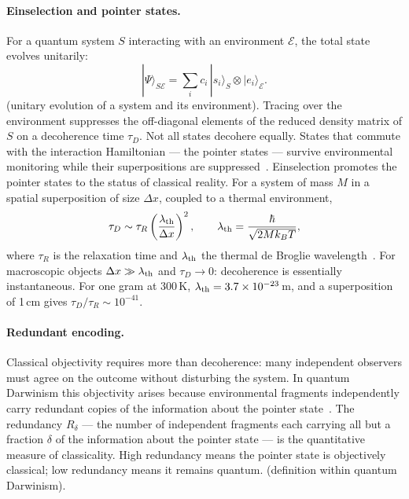 \paragraph{Einselection and pointer states.} For a quantum system $S$ interacting with an environment $\mathcal E$, the total state evolves unitarily:
\begin{equation}
|\Psi\rangle_{S\mathcal E}=\sum_i c_i\,|s_i\rangle_S\otimes|e_i\rangle_{\mathcal E}.\label{eq:qr_SE}
\end{equation}
\derived{} (unitary evolution of a system and its environment). Tracing over the environment suppresses the off-diagonal elements of the reduced density
matrix of $S$ on a decoherence time $\tau_D$. Not all states decohere equally. States that commute with the interaction Hamiltonian --- the pointer
states --- survive environmental monitoring while their superpositions are suppressed~\cite{Zurek1981}. Einselection promotes the pointer states to the
status of classical reality. For a system of mass $M$ in a spatial superposition of size $\Delta x$, coupled to a thermal environment,
\begin{equation}
\tau_D\sim\tau_R\left(\frac{\lambda_{\rm th}}{\Delta x}\right)^2,\qquad\lambda_{\rm th}=\frac{\hbar}{\sqrt{2Mk_BT}},\label{eq:qr_tauD}
\end{equation}
where $\tau_R$ is the relaxation time and $\lambda_{\rm th}$ the thermal de Broglie wavelength~\cite{Zurek2003,JoosZeh1985}. \derived{} For macroscopic
objects $\Delta x\gg\lambda_{\rm th}$ and $\tau_D\to0$: decoherence is essentially instantaneous. For one gram at 300\,K, $\lambda_{\rm th}=3.7\times
10^{-23}$\,m, and a superposition of 1\,cm gives $\tau_D/\tau_R\sim10^{-41}$. \calc

\paragraph{Redundant encoding.} Classical objectivity requires more than decoherence: many independent observers must agree on the outcome without
disturbing the system. In quantum Darwinism this objectivity arises because environmental fragments independently carry redundant copies of the
information about the pointer state~\cite{Zurek2009}. The redundancy $R_\delta$ --- the number of independent fragments each carrying all but a fraction
$\delta$ of the information about the pointer state --- is the quantitative measure of classicality. High redundancy means the pointer state is
objectively classical; low redundancy means it remains quantum. \derived{} (definition within quantum Darwinism).

